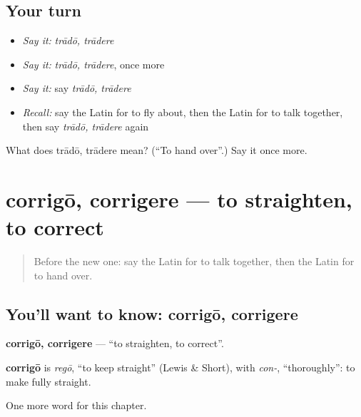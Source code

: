 \subsection*{Your turn}
\begin{itemize}
\raggedright
  \item \emph{Say it:} \emph{trādō, trādere}
  \item \emph{Say it:} \emph{trādō, trādere}, once more
  \item \emph{Say it:} say \emph{trādō, trādere}
  \item \emph{Recall:} say the Latin for to fly about, then the Latin for to talk together, then say \emph{trādō, trādere} again
\end{itemize}

\begin{tcolorbox}[breakable,colback=teal!4,colframe=teal!35!black,title={Before you move on}]
What does trādō, trādere mean? (\textquotedblleft{}To hand over\textquotedblright{}.) Say it once more.
\end{tcolorbox}
\section[corrigō, corrigere]{corrigō, corrigere — to straighten, to correct}

\label{lesson:LA-C201-corrigo}



\begin{quote}
Before the new one: say the Latin for to talk together, then the Latin for to hand over.
\end{quote}

\subsection*{You'll want to know: corrigō, corrigere}
\textbf{corrigō, corrigere} — \textquotedblleft{}to straighten, to correct\textquotedblright{}.

\begin{cousinweb}
\textbf{corrigō} is \emph{regō}, \textquotedblleft{}to keep straight\textquotedblright{} (Lewis \& Short), with \emph{con-}, \textquotedblleft{}thoroughly\textquotedblright{}: to make fully straight.
\end{cousinweb}

\begin{grammarlens}[title={What you've built}]
One more word for this chapter.
\end{grammarlens}

